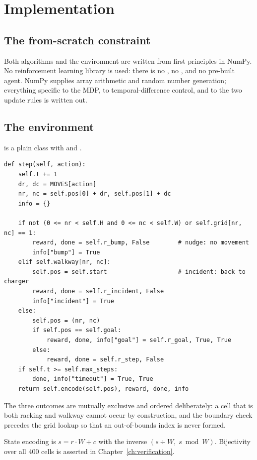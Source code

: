 \chapter{Implementation}
\label{ch:implementation}

\section{The from-scratch constraint}

Both algorithms and the environment are written from first principles in NumPy. No reinforcement
learning library is used: there is no , no , and no
pre-built agent. NumPy supplies array arithmetic and random number generation; everything
specific to the MDP, to temporal-difference control, and to the two update rules is written out.

\section{The environment}

 is a plain class with  and .

{\small
\begin{verbatim}
def step(self, action):
    self.t += 1
    dr, dc = MOVES[action]
    nr, nc = self.pos[0] + dr, self.pos[1] + dc
    info = {}

    if not (0 <= nr < self.H and 0 <= nc < self.W) or self.grid[nr, nc] == 1:
        reward, done = self.r_bump, False        # nudge: no movement
        info["bump"] = True
    elif self.walkway[nr, nc]:
        self.pos = self.start                    # incident: back to charger
        reward, done = self.r_incident, False
        info["incident"] = True
    else:
        self.pos = (nr, nc)
        if self.pos == self.goal:
            reward, done, info["goal"] = self.r_goal, True, True
        else:
            reward, done = self.r_step, False
    if self.t >= self.max_steps:
        done, info["timeout"] = True, True
    return self.encode(self.pos), reward, done, info
\end{verbatim}}

The three outcomes are mutually exclusive and ordered deliberately: a cell that is both racking and
walkway cannot occur by construction, and the boundary check precedes the grid lookup so that an
out-of-bounds index is never formed.

State encoding is $s = r \cdot W + c$ with the inverse $(s \div W,\; s \bmod W)$. Bijectivity over
all 400 cells is asserted in Chapter~\ref{ch:verification}.

